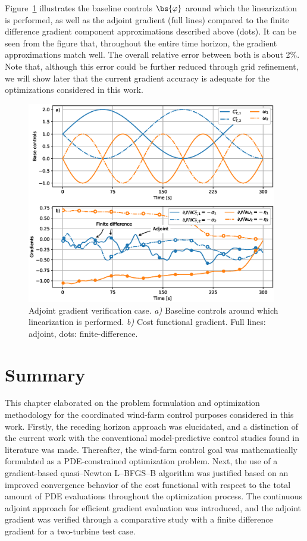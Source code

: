 	Figure~\ref{fig:gradient_verification} illustrates the baseline controls $\bs{\varphi}$ around which the linearization is performed, as well as the adjoint gradient (full lines) compared to the finite difference gradient component approximations described above (dots). It can be seen from the figure that, throughout the entire time horizon, the gradient approximations match well. The overall relative error between both is about 2$\%$. Note that, although this error could be further reduced through grid refinement, we will show later that the current gradient accuracy is adequate for the optimizations considered in this work.
	
	\begin{figure}
		\includegraphics[width=0.975\textwidth]{chapters/optimal_control_problem/gradient_verification.eps}
		\caption[Adjoint gradient verification case.]{Adjoint gradient verification case. \emph{a)} Baseline controls around which linearization is performed. \emph{b)} Cost functional gradient. Full lines: adjoint, dots: finite-difference. \label{fig:gradient_verification}}
	\end{figure}

\section{Summary}\label{sec:opt_prob_summ}
This chapter elaborated on the problem formulation and optimization methodology for the coordinated wind-farm control purposes considered in this work. Firstly, the receding horizon approach was elucidated, and a distinction of the current work with the conventional model-predictive control studies found in literature was made. Thereafter, the wind-farm control goal was mathematically formulated as a PDE-constrained optimization problem. Next, the use of a gradient-based quasi--Newton L--BFGS--B algorithm was justified based on an improved convergence behavior of the cost functional with respect to the total amount of PDE evaluations throughout the optimization process. The continuous adjoint approach for efficient gradient evaluation was introduced, and the adjoint gradient was verified through a comparative study with a finite difference gradient for a two-turbine test case. 

